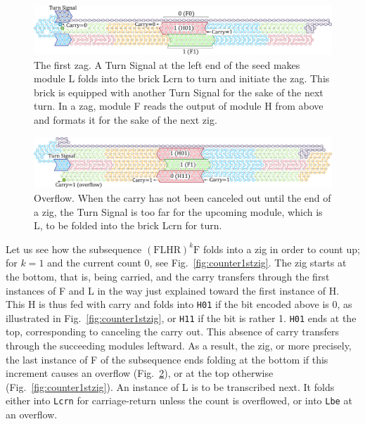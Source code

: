 \documentclass[twocolumn]{svjour3}
\begin{document}
\begin{figure}[tb]
\centering
\includegraphics[width=\linewidth]{fig/svg/CounterEx11_1.pdf}
\caption{
The first zag. 
A Turn Signal at the left end of the seed makes module L folds into the brick Lcrn to turn and initiate the zag. 
This brick is equipped with another Turn Signal for the sake of the next turn. 
In a zag, module F reads the output of module H from above and formats it for the sake of the next zig. 
}
\label{fig:counter1stzag}
\end{figure}

\begin{figure}[tb]
\centering
\includegraphics[width=\linewidth]{fig/svg/CounterEx13_1.pdf}
\caption{
Overflow. 
When the carry has not been canceled out until the end of a zig, the Turn Signal is too far for the upcoming module, which is L, to be folded into the brick Lcrn for turn. 
}
\label{fig:overflowex1}
\end{figure}

Let us see how the subsequence $(\mathrm{FLHR})^k \mathrm{F}$ folds into a zig in order to count up; for $k=1$ and the current count 0, see Fig.~\ref{fig:counter1stzig}.
The zig starts at the bottom, that is, being carried, and the carry transfers through the first instances of F and L in the way just explained toward the first instance of H.
This H is thus fed with carry and folds into \texttt{H01} if the bit encoded above is 0, as illustrated in Fig.~\ref{fig:counter1stzig}, or \texttt{H11} if the bit is rather 1.
\texttt{H01} ends at the top, corresponding to canceling the carry out.
This absence of carry transfers through the succeeding modules leftward.
As a result, the zig, or more precisely, the last instance of F of the subsequence ends folding at the bottom if this increment causes an overflow (Fig.~\ref{fig:overflowex1}), or at the top otherwise (Fig.~\ref{fig:counter1stzig}).
An instance of L is to be transcribed next.
It folds either into \texttt{Lcrn} for carriage-return unless the count is overflowed, or into \texttt{Lbe} at an overflow.
\end{document}
